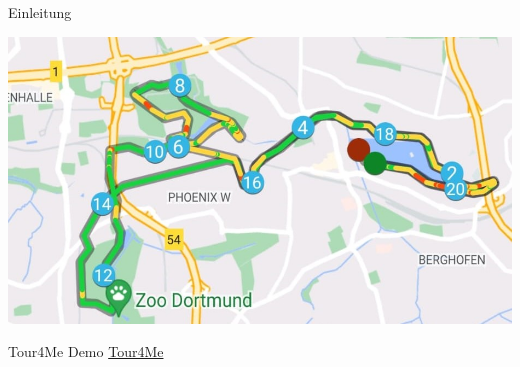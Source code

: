 \documentclass[aspectratio=169,xcolor=dvipsnames, t]{beamer}
\begin{document}
\begin{frame}{Einleitung}
\begin{minipage}[t][0.7\textheight][b]{0.48\textwidth}
{\begin{flushright}
				\end{flushright}
				\begin{flushleft}
					\includegraphics[height=0.3\textheight]{images/laufstrecke_komplex.jpg}
				\end{flushleft}}
		\end{minipage}
 	\end{frame}
	
	\begin{frame}{Tour4Me Demo}
	\centering
	\vspace{2cm}
	\Huge \href{http://tour4me.cs.tu-dortmund.de/} {Tour4Me}
	\end{frame}
	
\end{document}
